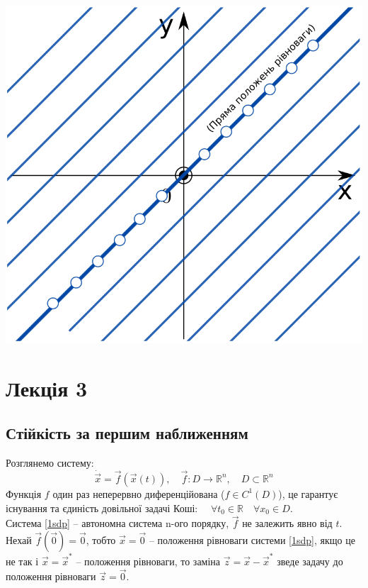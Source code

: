 \documentclass[14pt,a4paper]{scrartcl}
\theoremstyle{definition}
\theoremstyle{definition}
\theoremstyle{definition}
\newcommand*{\vect}[1]{\overrightarrow{\ensuremath{#1}}}
\begin{document}
\begin{center} \includegraphics[scale=0.3]{assets/lectures_recent-49093f01.png} \end{center}

\section{Лекція 3}
\subsection{Стійкість за першим наближенням}

Розглянемо систему:
\begin{equation}\label{1sdp}
  \dot{\vect{x}} = \overrightarrow{f}(\overrightarrow{x}(t)), \quad \overrightarrow{f}: D \rightarrow \mathbb{R}^n, \quad D \subset \mathbb{R}^n
\end{equation}
Функція $f$ один раз неперервно диференційована ($f \in C^1(D)$), це гарантує існування та єдиність довільної задачі Коші: $\quad \forall t_0 \in \mathbb{R} \quad \forall x_0 \in D$. \\
Система \eqref{1sdp} -- автономна система n-ого порядку, $\overrightarrow{f}$ не залежить явно від $t$.
Нехай $\overrightarrow{f}(\overrightarrow{0}) = \overrightarrow{0}$, тобто $\overrightarrow{x} = \overrightarrow{0}$ -- положення рівноваги системи \eqref{1sdp}, якщо це не так і $\overrightarrow{x} = \overrightarrow{x}^*$ -- положення рівноваги, то заміна $\overrightarrow{z} = \overrightarrow{x} - \overrightarrow{x}^*$ зведе задачу до положення рівноваги $\overrightarrow{z} = \overrightarrow{0}$.
\end{document}
